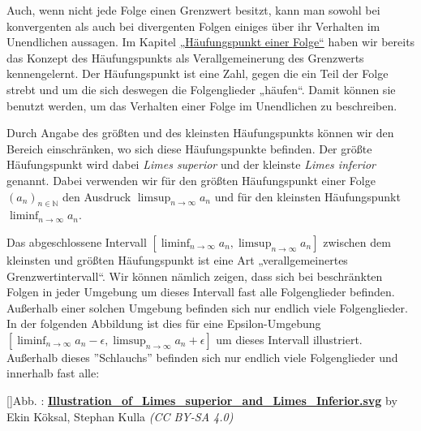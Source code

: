 \documentclass[fontsize=9pt,
               parskip=half-,
               DIV=14,
               listof=chapterentry,
               tocflat]{scrbook}
\newcounter{imagelabel}
\begin{document}
Auch, wenn nicht jede Folge einen Grenzwert besitzt, kann man sowohl bei konvergenten als auch bei divergenten Folgen einiges über ihr Verhalten im Unendlichen aussagen. Im Kapitel \href{https://de.wikibooks.org/wiki/Mathe\_für\_Nicht-Freaks:\_Häufungspunkt\_einer\_Folge}
{„Häufungspunkt einer Folge“} haben wir bereits das Konzept des Häufungspunkts als Verallgemeinerung des Grenzwerts kennengelernt. Der Häufungspunkt ist eine Zahl, gegen die ein Teil der Folge strebt und um die sich deswegen die Folgenglieder „häufen“. Damit können sie benutzt werden, um das Verhalten einer Folge im Unendlichen zu beschreiben.

Durch Angabe des größten und des kleinsten Häufungspunkts können wir den Bereich einschränken, wo sich diese Häufungspunkte befinden. Der größte Häufungspunkt wird dabei \emph{Limes superior} und der kleinste \emph{Limes inferior} genannt. Dabei verwenden wir für den größten Häufungspunkt einer Folge $(a_{n})_{n\in \mathbb {N} }$ den Ausdruck $\limsup _{n\to \infty }a_{n}$ und für den kleinsten Häufungspunkt $\liminf _{n\to \infty }a_{n}$.

Das abgeschlossene Intervall $\left[\liminf _{n\to \infty }a_{n},\limsup _{n\to \infty }a_{n}\right]$ zwischen dem kleinsten und größten Häufungspunkt ist eine Art „verallgemeinertes Grenzwertintervall“. Wir können nämlich zeigen, dass sich bei beschränkten Folgen in jeder Umgebung um dieses Intervall fast alle Folgenglieder befinden. Außerhalb einer solchen Umgebung befinden sich nur endlich viele Folgenglieder. In der folgenden Abbildung ist dies für eine Epsilon-Umgebung $\left[\liminf _{n\to \infty }a_{n}-\epsilon ,\limsup _{n\to \infty }a_{n}+\epsilon \right]$ um dieses Intervall illustriert. Außerhalb dieses {''}Schlauchs{''} befinden sich nur endlich viele Folgenglieder und innerhalb fast alle:

[]{Abb. : \protect\href{https://commons.wikimedia.org/wiki/File:Illustration_of_Limes_superior_and_Limes_Inferior.svg}{\textbf{Illustration\allowbreak\_of\allowbreak\_Limes\allowbreak\_superior\allowbreak\_and\allowbreak\_Limes\allowbreak\_Inferior.svg}} by Ekin Köksal, Stephan Kulla \textit{(CC BY-SA 4.0)}}\begin{center}
\end{center}
\end{document}
